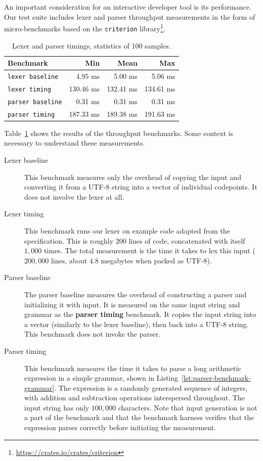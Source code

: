 An important consideration for an interactive developer tool is its performance.
Our test suite includes lexer and parser throughput measurements in the form of
micro-benchmarks based on the \texttt{criterion}
library\footnote{\url{https://crates.io/crates/criterion}}.

\begin{table}[h]
	\centering
	\begin{tabular}{lrrr}
		\hline
		\textbf{Benchmark}         & Min       & \textbf{Mean} & Max \\
		\hline
		\texttt{lexer baseline}    & 4.95   ms & 5.00   ms & 5.06   ms \\
		\texttt{lexer timing}      & 130.46 ms & 132.41 ms & 134.61 ms \\
		\texttt{parser baseline}   & 0.31   ms & 0.31   ms & 0.31   ms \\
		\texttt{parser timing}     & 187.33 ms & 189.38 ms & 191.63 ms \\
		\hline
	\end{tabular}
	\caption{Lexer and parser timings, statistics of 100 samples.}
	\label{tab:throughput}
\end{table}

Table~\ref{tab:throughput} shows the results of the throughput benchmarks. Some
context is necessary to understand these measurements.

\begin{description}
	\item[Lexer baseline] This benchmark measures only the overhead of copying
		the input and converting it from a UTF-8 string into a vector of
		individual codepoints. It does not involve the lexer at all.
	\item[Lexer timing] This benchmark runs our lexer on example \pfs code
		adapted from the specification\cite{p416:v123:spec}. This is roughly
		\(200\) lines of code, concatenated with itself \(1,000\) times. The
		total measurement is the time it takes to lex this input (\(200,000\)
		lines, about \(4.8\) megabytes when packed as UTF-8).
	\item[Parser baseline] The parser baseline measures the overhead of
		constructing a parser and initializing it with input. It is measured on
		the same input string and grammar as the \textbf{parser timing}
		benchmark. It copies the input string into a vector (similarly to the
		lexer baseline), then back into a UTF-8 string. This benchmark does not
		invoke the parser.
	\item[Parser timing] This benchmark measures the time it takes to parse a
		long arithmetic expression in a simple grammar, shown in
		Listing~\ref{lst:parser-benchmark-grammar}. The expression is a randomly
		generated sequence of integers, with addition and subtraction operations
		interspersed throughout. The input string has only \(100,000\)
		characters. Note that input generation is not a part of the benchmark
		and that the benchmark harness verifies that the expression parses
		correctly before initiating the measurement.
\end{description}

